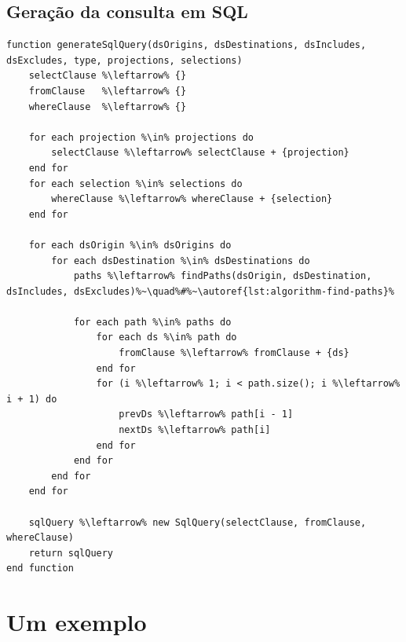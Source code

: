 \subsection{Geração da consulta em SQL}


\begin{minipage}[c]{0.95\textwidth}
\begin{lstlisting}[language=pseudocode,label={lst:algorithm-generate-sql-query},caption={[Geração da consulta em SQL]Geração da consulta na linguagem SQL a partir das especificações do usuário.}]
function generateSqlQuery(dsOrigins, dsDestinations, dsIncludes, dsExcludes, type, projections, selections)
    selectClause %\leftarrow% {}
    fromClause   %\leftarrow% {}
    whereClause  %\leftarrow% {}
    
    for each projection %\in% projections do
        selectClause %\leftarrow% selectClause + {projection}
    end for
    for each selection %\in% selections do
        whereClause %\leftarrow% whereClause + {selection}
    end for
    
    for each dsOrigin %\in% dsOrigins do
        for each dsDestination %\in% dsDestinations do
            paths %\leftarrow% findPaths(dsOrigin, dsDestination, dsIncludes, dsExcludes)%~\quad%#%~\autoref{lst:algorithm-find-paths}%
            
            for each path %\in% paths do
                for each ds %\in% path do
                    fromClause %\leftarrow% fromClause + {ds}
                end for                
                for (i %\leftarrow% 1; i < path.size(); i %\leftarrow% i + 1) do
                    prevDs %\leftarrow% path[i - 1]
                    nextDs %\leftarrow% path[i]
                end for
            end for
        end for
    end for
    
    sqlQuery %\leftarrow% new SqlQuery(selectClause, fromClause, whereClause)
    return sqlQuery
end function
\end{lstlisting}
\end{minipage}

\section{Um exemplo}

